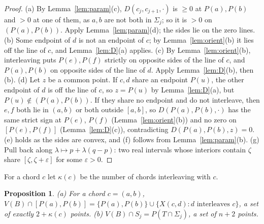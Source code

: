 \documentclass[11pt]{amsart}
\theoremstyle{plain}
\newtheorem{proposition}[theorem]{Proposition}
\theoremstyle{definition}
\newcommand{\lean}[1]{{\upshape[#1]}}
\begin{document}
\begin{proof}
(a) By Lemma~\ref{lem:param}(c), $D(c_j,c_{j+1},\cdot)$ is $\ge0$ at $P(a),P(b)$ and $>0$ at one of them, as $a,b$ are not both in $\Sigma_j$; so it is $>0$ on $(P(a),P(b))$. Apply Lemma~\ref{lem:param}(d); the sides lie on the zero lines.
(b) Some endpoint of $d$ is not an endpoint of $c$; by Lemma~\ref{lem:orient}(b) it lies off the line of $c$, and Lemma~\ref{lem:D}(a) applies.
(c) By Lemma~\ref{lem:orient}(b), interleaving puts $P(e),P(f)$ strictly on opposite sides of the line of $c$, and $P(a),P(b)$ on opposite sides of the line of $d$. Apply Lemma~\ref{lem:D}(b), then (b).
(d) Let $z$ be a common point. If $c,d$ share an endpoint $P(u)$, the other endpoint of $d$ is off the line of $c$, so $z=P(u)$ by Lemma~\ref{lem:D}(a), but $P(u)\notin(P(a),P(b))$. If they share no endpoint and do not interleave, then $e,f$ both lie in $(a,b)$ or both outside $[a,b]$, so $D(P(a),P(b),\cdot)$ has the same strict sign at $P(e)$, $P(f)$ (Lemma~\ref{lem:orient}(b)) and no zero on $[P(e),P(f)]$ (Lemma~\ref{lem:D}(c)), contradicting $D(P(a),P(b),z)=0$.
(e) holds as the sides are convex, and (f) follows from Lemma~\ref{lem:param}(b). (g) Pull back along $\lambda\mapsto p+\lambda(q-p)$: two real intervals whose interiors contain $\zeta$ share $[\zeta,\zeta+\varepsilon]$ for some $\varepsilon>0$.
\end{proof}

For a chord $c$ let $\kappa(c)$ be the number of chords interleaving with $c$.

\begin{proposition}\label{prop:vertices}
(a) \lean{\decl{V_chord}, \decl{VC_card}} For a chord $c=(a,b)$, $V(B)\cap[P(a),P(b)]=\{P(a),P(b)\}\cup\{X(c,d): d\text{ interleaves }c\}$, a set of exactly $2+\kappa(c)$ points.
(b) \lean{\decl{V_side}, \decl{VS_card}} $V(B)\cap S_j=P(T\cap\Sigma_j)$, a set of $n+2$ points.
\end{proposition}
\end{document}
